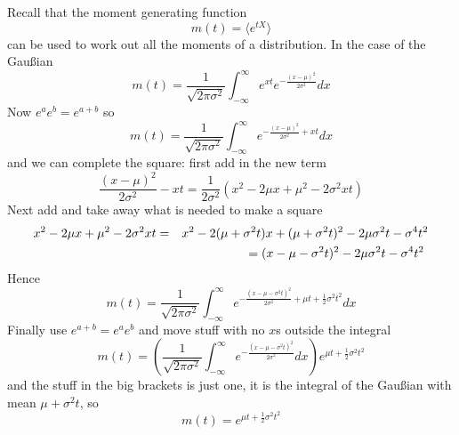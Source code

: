 \documentclass[11pt,a4paper]{scrartcl}
\begin{document}
Recall that the moment generating function 
\begin{equation}
m(t)=\langle e^{tX}\rangle
\end{equation}
can be used to work out all the moments of a distribution. In the case of the Gau\ss{}ian
\begin{equation}
m(t)=\frac{1}{\sqrt{2\pi\sigma^2}}\int_{-\infty}^\infty e^{xt}e^{-\frac{(x-\mu)^2}{2\sigma^2}}dx
\end{equation}
Now $e^ae^b=e^{a+b}$ so
\begin{equation}
m(t)=\frac{1}{\sqrt{2\pi\sigma^2}}\int_{-\infty}^\infty e^{-\frac{(x-\mu)^2}{2\sigma^2}+xt}dx
\end{equation}
and we can complete the square: first add in the new term
\begin{equation}
\frac{(x-\mu)^2}{2\sigma^2}-xt=\frac{1}{2\sigma^2}(x^2-2\mu x +\mu^2-2\sigma^2 xt)
\end{equation}
Next add and take away what is needed to make a square
\begin{eqnarray}
x^2-2\mu x +\mu^2-2\sigma^2 xt &=& x^2-2(\mu+\sigma^2 t) x +(\mu+\sigma^2 t)^2 - 2\mu\sigma^2 t -\sigma^4 t^2\cr
                                &&= (x-\mu-\sigma^2 t)^2 - 2\mu\sigma^2 t -\sigma^4 t^2\
\end{eqnarray}
Hence
\begin{equation}
m(t)=\frac{1}{\sqrt{2\pi\sigma^2}}\int_{-\infty}^\infty e^{-\frac{(x-\mu-\sigma^2 t)^2}{2\sigma^2}+\mu t + \frac{1}{2}\sigma^2 t^2}dx
\end{equation}     
Finally use $e^{a+b}=e^ae^b$ and move stuff with no $x$s outside the integral
 \begin{equation}
m(t)=\left(\frac{1}{\sqrt{2\pi\sigma^2}}\int_{-\infty}^\infty e^{-\frac{(x-\mu-\sigma^2 t)^2}{2\sigma^2}}dx\right) e^{\mu t + \frac{1}{2}\sigma^2 t^2}
\end{equation}
and the stuff in the big brackets is just one, it is the integral of the Gau\ss{}ian with mean $\mu+\sigma^2 t$, so
\begin{equation}
m(t)= e^{\mu t + \frac{1}{2}\sigma^2 t^2}
\end{equation}
\end{document}
